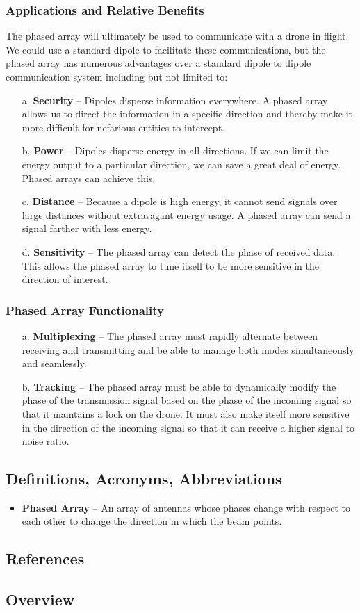 \documentclass[ProjectRequirements.tex]{subfiles}
\begin{document}
		\subsubsection{Applications and Relative Benefits}
			The phased array will ultimately be used to communicate with a drone in flight. We could use a standard dipole to facilitate these communications, but the phased array has numerous advantages over a standard dipole to dipole communication system including but not limited to:
			\begin{itemize} \itemsep1pt
				\item[a.]	\textbf{Security} -- Dipoles disperse information everywhere. A phased array allows us to direct the information in a specific direction and thereby make it more difficult for nefarious entities to intercept.
				\item[b.] 	\textbf{Power} -- Dipoles disperse energy in all directions. If we can limit the energy output to a particular direction, we can save a great deal of energy. Phased arrays can achieve this.
				\item[c.] 	\textbf{Distance} -- Because a dipole is high energy, it cannot send signals over large distances without extravagant energy usage. A phased array can send a signal farther with less energy.
 				\item[d.] 	\textbf{Sensitivity} -- The phased array can detect the phase of received data. This allows the phased array to tune itself to be more sensitive in the direction of interest.
			\end{itemize}
		\subsubsection{Phased Array Functionality}
			\begin{itemize} \itemsep-1pt
				\item[a.]	\textbf{Multiplexing} -- The phased array must rapidly alternate between receiving and transmitting and be able to manage both modes simultaneously and seamlessly.
				\item[b.] 	\textbf{Tracking} -- The phased array must be able to dynamically modify the phase of the transmission signal based on the phase of the incoming signal so that it maintains a lock on the drone. It must also make itself more sensitive in the direction of the incoming signal so that it can receive a higher signal to noise ratio.
			\end{itemize}
	\subsection{Definitions, Acronyms, Abbreviations}
		\begin{itemize}
			\item \textbf{Phased Array} -- An array of antennas whose phases change with respect to each other to change the direction in which the beam points.
		\end{itemize}
	\subsection{References}
	\subsection{Overview}
\end{document}
